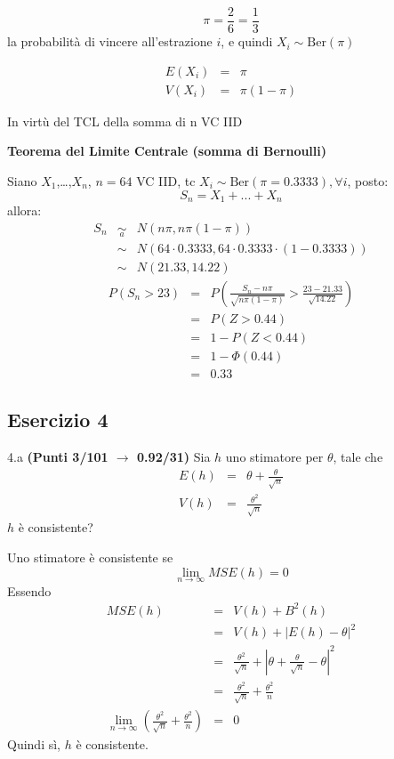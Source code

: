\documentclass[
  11pt,
]{book}
\theoremstyle{mytheoremstyle}
\theoremstyle{mydefstyle}
\newenvironment{sol}
  {
  \begin{tcolorbox}[enhanced,breakable,arc=0.1mm,boxrule=1pt,colback=white,colframe=iblue,
  title=\bf \fontfamily{lmss}\selectfont \hspace{.5 cm} Soluzione,drop fuzzy shadow]

}{
\end{tcolorbox}
  }
\begin{document}
\begin{sol}
\[
\pi=\frac 2 6=\frac 13
\]
la probabilità di vincere all'estrazione \(i\), e quindi \(X_i\sim\text{Ber}(\pi)\)

\begin{eqnarray*}
E(X_i)&=&\pi\\
V(X_i)&=&\pi(1-\pi)
\end{eqnarray*}

In virtù del TCL della somma di n VC IID

\textbf{Teorema del Limite Centrale (somma di Bernoulli)}

Siano \(X_1\),\ldots,\(X_n\), \(n=64\) VC IID, tc \(X_i\sim\text{Ber}(\pi=0.3333)\)\(,\forall i\), posto:
\[
      S_n = X_1 + ... + X_n
      \]
allora:\begin{eqnarray*}
  S_n & \mathop{\sim}\limits_{a}& N(n\pi,n\pi(1-\pi)) \\
      &\sim & N(64\cdot0.3333,64\cdot0.3333\cdot(1-0.3333)) \\
      &\sim & N(21.33,14.22)
  \end{eqnarray*}\begin{eqnarray*}
      P( S_n   >   23 ) 
        &=& P\left(  \frac { S_n  -  n\pi }{ \sqrt{n\pi(1-\pi)} }  >  \frac { 23  -  21.33 }{\sqrt{ 14.22 }} \right)  \\
                 &=& P\left(  Z   >   0.44 \right) \\    &=& 1-P(Z< 0.44 )\\ 
                 &=&  1-\Phi( 0.44 ) \\ &=&  0.33 
      \end{eqnarray*}

\end{sol}

\subsection{Esercizio 4}\label{esercizio-4-4}

4.a \textbf{(Punti 3/101 \(\rightarrow\) 0.92/31)} Sia \(h\) uno stimatore per \(\theta\), tale che
\begin{eqnarray*}
E(h)&=&\theta+\frac\theta {\sqrt{ n}}\\
V(h)&=&\frac{\theta^2}{\sqrt n}
\end{eqnarray*}
\(h\) è consistente?

\begin{sol}
Uno stimatore è consistente se
\[
\lim_{n\to\infty} MSE(h)=0
\]
Essendo
\begin{eqnarray*}
MSE(h)&=&V(h)+B^2(h)\\
&=&V(h)+|E(h)-\theta|^2\\
&=&\frac{\theta^2}{\sqrt n}+\left|\theta+\frac\theta {\sqrt{ n}}-\theta\right|^2\\
&=&\frac{\theta^2}{\sqrt n}+\frac{\theta^2} { n}\\
\lim_{n\to\infty} \left(\frac{\theta^2}{\sqrt n}+\frac{\theta^2} { n}\right)&=&0
\end{eqnarray*}
Quindi sì, \(h\) è consistente.

\end{sol}
\end{document}
